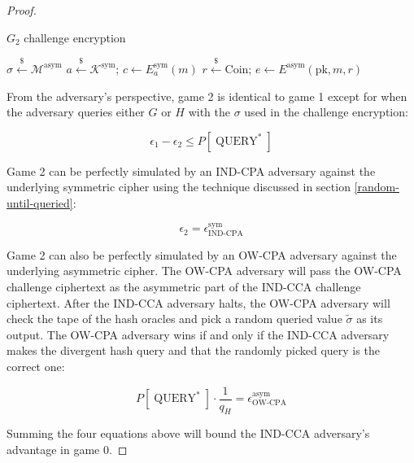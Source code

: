 \documentclass{article}
\newcommand{\leftsample}{\overset{{\scriptscriptstyle\$}}{\leftarrow}}
\begin{document}
\begin{proof}
\begin{multicols}{2}
        \begin{algorithm}[H]
            \SetAlgoLined
            \caption{$G_2$ challenge encryption}
            $\sigma \leftsample \mathcal{M}^\text{asym}$\;
            $a \leftsample \mathcal{K}^\text{sym}$; $c \leftarrow E^\text{sym}_a(m)$\;
            $r \leftsample \text{Coin}$;
            $e \leftarrow E^\text{asym}(\text{pk}, m, r)$\;
            \;
        \end{algorithm}
    \end{multicols}

    From the adversary's perspective, game 2 is identical to game 1 except for when the adversary queries either $G$ or $H$ with the $\sigma$ used in the challenge encryption:

    \begin{equation}
        \epsilon_1 - \epsilon_2 \leq P[\operatorname{QUERY}^\ast]
    \end{equation}

    Game 2 can be perfectly simulated by an IND-CPA adversary against the underlying symmetric cipher using the technique discussed in section \ref{random-until-queried}:

    \begin{equation}
        \epsilon_2 = \epsilon^\text{sym}_\text{IND-CPA}
    \end{equation}

    Game 2 can also be perfectly simulated by an OW-CPA adversary against the underlying asymmetric cipher. The OW-CPA adversary will pass the OW-CPA challenge ciphertext as the asymmetric part of the IND-CCA challenge ciphertext. After the IND-CCA adversary halts, the OW-CPA adversary will check the tape of the hash oracles and pick a random queried value $\tilde{\sigma}$ as its output. The OW-CPA adversary wins if and only if the IND-CCA adversary makes the divergent hash query and that the randomly picked query is the correct one:

    \begin{equation}
        P[\operatorname{QUERY}^\ast] \cdot \frac{1}{q_H} = \epsilon^\text{asym}_\text{OW-CPA}
    \end{equation}

    Summing the four equations above will bound the IND-CCA adversary's advantage in game 0.
\end{proof}
\end{document}
